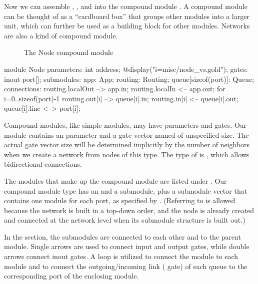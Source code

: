 Now we can assemble , , and  into the compound
module . A compound module can be thought of as a ``cardboard box'' that
groups other modules into a larger unit, which can further be used as a building
block for other modules. Networks are also a kind of compound module.

\begin{figure}[htbp]
  \begin{center}
    \caption{The Node compound module}
    \label{fig:ned-routing-node}
  \end{center}
\end{figure}

\begin{ned}
module Node
{
    parameters:
        int address;
        @display("i=misc/node_vs,gold");
    gates:
        inout port[];
    submodules:
        app: App;
        routing: Routing;
        queue[sizeof(port)]: Queue;
    connections:
        routing.localOut --> app.in;
        routing.localIn <-- app.out;
        for i=0..sizeof(port)-1 {
            routing.out[i] --> queue[i].in;
            routing.in[i] <-- queue[i].out;
            queue[i].line <--> port[i];
        }
}
\end{ned}

Compound modules, like simple modules, may have parameters and gates. Our
 module contains an  parameter and a gate vector named
 of unspecified size. The actual gate vector size will be determined
implicitly by the number of neighbors when we create a network from nodes of
this type. The type of  is , which allows bidirectional
connections.

The modules that make up the compound module are listed under
. Our  compound module type has an  and
a  submodule, plus a  submodule vector that contains
one  module for each port, as specified by .
(Referring to  is allowed because the network is built in a
top-down order, and the node is already created and connected at the network
level when its submodule structure is built out.)

In the  section, the submodules are connected to each
other and to the parent module. Single arrows are used to connect input and
output gates, while double arrows connect inout gates. A  loop is
utilized to connect the  module to each  module and to
connect the outgoing/incoming link ( gate) of each queue to the
corresponding port of the enclosing module.


